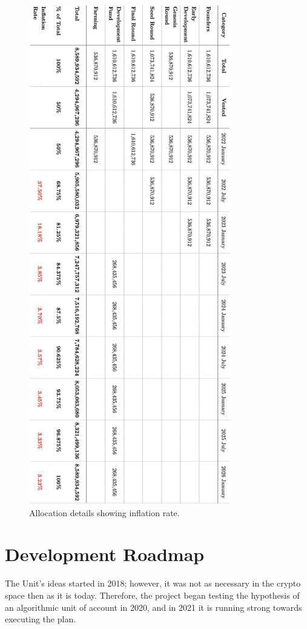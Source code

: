 \documentclass[12pt]{article}
\begin{document}
\begin{figure}[H]
\centering
  \includegraphics[width=3.5in]{images/The_Unit_Allocation_Table_2.png}
  \caption{Allocation details showing inflation rate.}
  \label{fig:allocation_table2}
\end{figure}






\section{Development Roadmap}

The Unit's ideas started in 2018; however, it was not as necessary in the crypto space then as it is today. Therefore, the project began testing the hypothesis of an algorithmic unit of account in 2020, and in 2021 it is running strong towards executing the plan.
\end{document}
